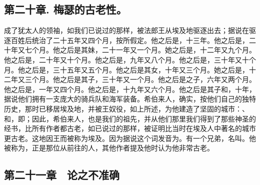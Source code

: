 
\subsection{第二十章. 梅瑟的古老性。}

成了犹太人的领袖，如我们已说过的那样，被法郎王从埃及地驱逐出去；据说在驱逐百姓后统治了二十五年又四个月，按所假定。他之后是，十三年。他之后是，二十年又七个月。他之后是其妹，二十一年又一个月。她之后是，十二年又九个月。他之后是，二十年又十个月。他之后是，九年又八个月。他之后是，三十年又十个月。他之后是，三十五年又五个月。他之后是其女，十年又三个月。她之后是，十二年又三个月。他之后是其子，三十年又一个月。他之后是之子，六年又两个月。他之后是，一年又四个月。他之后是，十九年又六个月。他之后是其子和，十年，据说他们拥有一支庞大的骑兵队和海军装备。希伯来人，确实，按他们自己的独特历史，那时已移居埃及地，并被王奴役，如上所述，为他建造了坚固的城市：、和，即；因此，希伯来人，也是我们的祖先，并从他们那里我们得到了那些神圣的经书，比所有作者都古老，如已说过的那样，被证明比当时在埃及人中著名的城市更古老。这地因王而被称为埃及。因为据说这个词发音为。有一个兄弟，名叫。他被称为，正是那位从前往的人，其他作者提及他时认为他非常古老。\par


\subsection{第二十一章　论之不准确}

